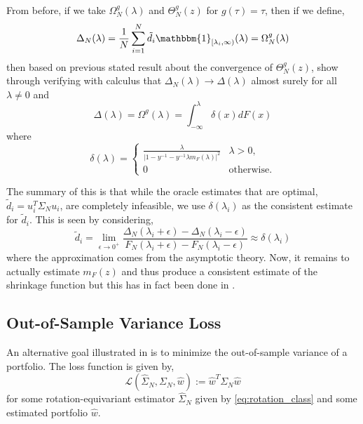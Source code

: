 \documentclass{article}
\begin{document}
From before, if we take $\Omega^g_N(\lambda)$ and $\Theta^g_N(z)$ for $g(\tau) =
\tau$, then if we define,
\begin{equation*}
	\Delta_N(\lambda)
		 = \frac1N \sum_{i=1}^N 
		 			\tilde{d}_i \mathbbm{1}_{[\lambda_i, \infty)}(\lambda)
		 = \Omega^g_N(\lambda)
\end{equation*}
then based on previous stated result about the convergence of $\Theta^g_N(z)$,
\cite{Ledoit2011Eigenvectors} show through verifying with calculus that
$\Delta_N(\lambda) \rightarrow \Delta(\lambda)$ almost surely for all $\lambda
\ne 0$ and
\begin{equation*}
	\Delta(\lambda) = \Omega^g(\lambda) = \int_{-\infty}^\lambda \delta(x)dF(x)
\end{equation*}
where 
\begin{equation}\label{eq:delta}
	\delta(\lambda) = 
		\begin{cases}
			\frac{\lambda}{|1 - y^{-1} - y^{-1}\lambda m_F(\lambda)|^2} & \lambda > 0,\\
			0 & \text{otherwise.}
		\end{cases}
\end{equation}

The summary of this is that while the oracle estimates that are optimal,
$\tilde{d}_i = u_i^T \Sigma_N u_i$, are completely infeasible, we use
$\delta(\lambda_i)$ as the consistent estimate for $\tilde{d}_i$. This is seen
by considering,
$$
	\tilde{d}_i = \lim_{\epsilon \rightarrow 0^+} 
		\frac{\Delta_N(\lambda_i + \epsilon) - \Delta_N(\lambda_i - \epsilon)}
			{F_N(\lambda_i + \epsilon) - F_N(\lambda_i - \epsilon)}
		\approx \delta(\lambda_i)
$$
where the approximation comes from the asymptotic theory.  Now, it remains to
actually estimate $m_F(z)$ and thus produce a consistent estimate of the
shrinkage function but this has in fact been done in \cite{Ledoit2015Spectrum}.


\subsection{Out-of-Sample Variance Loss}\label{sec:oos_var_loss}

An alternative goal illustrated in \cite{Ledoit2017Nonlinear} is to minimize
the out-of-sample variance of a portfolio.  The loss function is given by,
\begin{equation}\label{eq:oos_loss}
	\mathcal{L}(\hat{\Sigma}_N, \Sigma_N, \hat{w})
		:= \hat{w}^T \Sigma_N \hat{w}
\end{equation}
for some rotation-equivariant estimator $\hat{\Sigma}_N$ given by
\eqref{eq:rotation_class} and some estimated portfolio $\hat{w}$.
\end{document}
